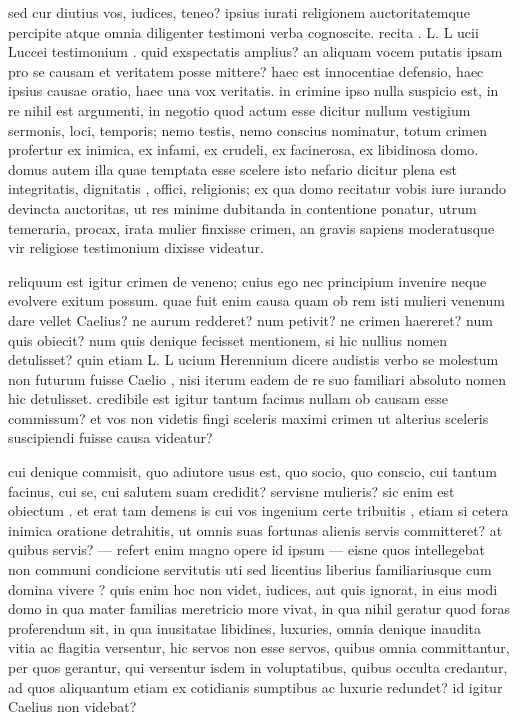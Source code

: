  sed cur diutius vos, iudices, teneo? ipsius iurati religionem auctoritatemque percipite atque omnia diligenter testimoni verba cognoscite. recita . L. L ucii Luccei testimonium . quid exspectatis amplius? an aliquam vocem putatis ipsam pro se causam et veritatem posse mittere? haec est innocentiae defensio, haec ipsius causae oratio, haec una vox veritatis. in crimine ipso nulla suspicio est, in re nihil est argumenti, in negotio quod actum esse dicitur nullum vestigium sermonis, loci, temporis; nemo testis, nemo conscius nominatur, totum crimen profertur ex inimica, ex infami, ex crudeli, ex facinerosa, ex libidinosa domo. domus autem illa quae temptata esse scelere isto nefario dicitur plena est integritatis, dignitatis , offici, religionis; ex qua domo recitatur vobis iure iurando devincta auctoritas, ut res minime dubitanda in contentione ponatur, utrum temeraria, procax, irata mulier finxisse crimen, an gravis sapiens moderatusque vir religiose testimonium dixisse videatur.

 reliquum est igitur crimen de veneno; cuius ego nec principium invenire neque evolvere exitum possum. quae fuit enim causa quam ob rem isti mulieri venenum dare vellet Caelius? ne aurum redderet? num petivit? ne crimen haereret? num quis obiecit? num quis denique fecisset mentionem, si hic nullius nomen detulisset? quin etiam L. L ucium Herennium dicere audistis verbo se molestum non futurum fuisse Caelio , nisi iterum eadem de re suo familiari absoluto nomen hic detulisset. credibile est igitur tantum facinus nullam ob causam esse commissum? et vos non videtis fingi sceleris maximi crimen ut alterius sceleris suscipiendi fuisse causa videatur?

 cui denique commisit, quo adiutore usus est, quo socio, quo conscio, cui tantum facinus, cui se, cui salutem suam credidit? servisne mulieris? sic enim est obiectum . et erat tam demens is cui vos ingenium certe tribuitis , etiam si cetera inimica oratione detrahitis, ut omnis suas fortunas alienis servis committeret? at quibus servis? — refert enim magno opere id ipsum — eisne quos intellegebat non communi condicione servitutis uti sed licentius liberius familiariusque cum domina vivere ? quis enim hoc non videt, iudices, aut quis ignorat, in eius modi domo in qua mater familias meretricio more vivat, in qua nihil geratur quod foras proferendum sit, in qua inusitatae libidines, luxuries, omnia denique inaudita vitia ac flagitia versentur, hic servos non esse servos, quibus omnia committantur, per quos gerantur, qui versentur isdem in voluptatibus, quibus occulta credantur, ad quos aliquantum etiam ex cotidianis sumptibus ac luxurie redundet? id igitur Caelius non videbat?

